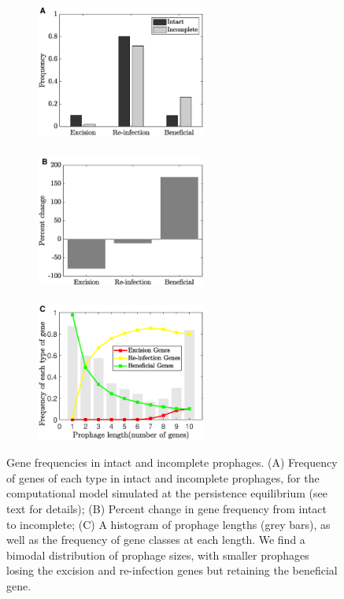   \begin{figure}[H]
    \centering
     \begin{subfigure}[t]{0.30\textwidth} 
    \includegraphics[height=1.8in,width=2.2in]{2Bi1}
     \end{subfigure}\hfill
         \begin{subfigure}[t]{0.30\textwidth}
    \includegraphics[height=1.8in,width=2.2in]{3Bi1}
    \end{subfigure}\hfill
    \begin{subfigure}[t]{0.30\textwidth}
        \includegraphics[height=1.8in,width=2.2in]{4Bi1}
    \end{subfigure}\hfill    
     \caption[Gene frequencies in intact and incomplete prophages.]{Gene frequencies in intact and incomplete prophages. (A) Frequency of genes of each type in intact and incomplete prophages, for the computational model simulated at the persistence equilibrium (see text for details); (B) Percent change in gene frequency from intact to incomplete; (C) A histogram of prophage lengths (grey bars), as well as the frequency of gene classes at each length.  We find a bimodal distribution of prophage sizes, with smaller prophages losing the excision and re-infection genes but retaining the beneficial gene.}
     \label{fig:Biresults}
     \end{figure}
     
